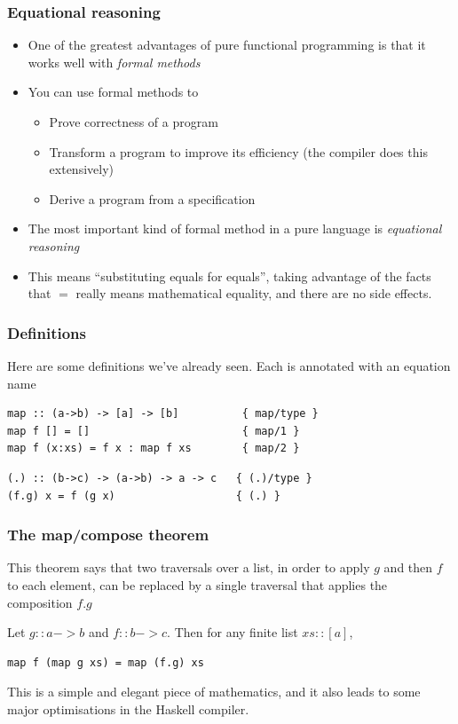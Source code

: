 \documentclass{beamer}
\begin{document}
\begin{frame}[fragile]
\frametitle{Equational reasoning}

\begin{itemize}
\item One of the greatest advantages of pure functional programming
  is that it works well with \emph{formal methods}
\item You can use formal methods to
  \begin{itemize}
  \item Prove correctness of a program
  \item Transform a program to improve its efficiency (the compiler
    does this extensively)
  \item Derive a program from a specification
  \end{itemize}
\item The most important kind of formal method in a pure language
  is \emph{equational reasoning}
\item This means ``substituting equals for equals'', taking
  advantage of the facts that $=$ really means mathematical
  equality, and there are no side effects.
\end{itemize}

\end{frame}

\begin{frame}[fragile]
\frametitle{Definitions}

Here are some definitions we've already seen.  Each is annotated
with an equation name

\begin{verbatim}
map :: (a->b) -> [a] -> [b]          { map/type }
map f [] = []                        { map/1 }
map f (x:xs) = f x : map f xs        { map/2 }
\end{verbatim}

\begin{verbatim}
(.) :: (b->c) -> (a->b) -> a -> c   { (.)/type }
(f.g) x = f (g x)                   { (.) }
\end{verbatim}
\end{frame}

\begin{frame}[fragile]
\frametitle{The map/compose theorem}

This theorem says that two traversals over a list, in order to
apply $g$ and then $f$ to each element, can be replaced by a single
traversal that applies the composition $f.g$

\begin{theorem}
  Let $g :: a->b$ and $f :: b->c$.  Then for any finite list $xs ::
  [a]$,
\begin{verbatim}
map f (map g xs) = map (f.g) xs
\end{verbatim}
\end{theorem}

This is a simple and elegant piece of mathematics, and it also
leads to some major optimisations in the Haskell compiler.

\end{frame}
\end{document}
